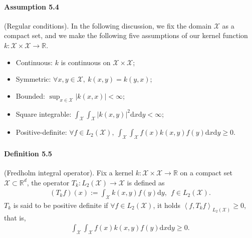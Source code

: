 \documentclass{article}
\begin{document}
\paragraph{Assumption 5.4} (Regular conditions). In the following discussion, we fix the domain $\mathcal{X}$ as a compact set, and we make the following five assumptions of our kernel function $k:\mathcal{X}\times\mathcal{X}\to\mathbb{R}$.
\begin{itemize}
	\item Continuous: $k$ is continuous on $\mathcal{X}\times\mathcal{X}$;
	\item Symmetric: $\forall x, y\in\mathcal{X},\ k(x,y) = k(y,x)$;
	\item Bounded: $\sup_{x\in\mathcal{X}}\left\vert k(x,x)\right\vert < \infty$;
	\item Square integrable: $\int_\mathcal{X}\int_\mathcal{X}\vert k(x,y)\vert^2\mathrm{d}x\mathrm{d}y < \infty$;
	\item Positive-definite:  $\forall f\in L_2(\mathcal{X}),\ \int_\mathcal{X}\int_\mathcal{X} f(x)k(x,y)f(y)\mathrm{d}x\mathrm{d}y \geq 0.$
\end{itemize}

\paragraph{Definition 5.5} (Fredholm integral operator). Fix a kernel $k:\mathcal{X}\times\mathcal{X}\to\mathbb{R}$ on a compact set $\mathcal{X}\subset\mathbb{R}^d$, the operator $T_k:L_2(\mathcal{X})\to\mathcal{X}$ is defined as
\begin{align}
	(T_kf)(x) := \int_\mathcal{X} k(x, y)f(y)\mathrm{d}y,\ \ f\in L_2(\mathcal{X}).\tag{5.12}
\end{align}
$T_k$ is said to be positive definite if $\forall f\in L_2(\mathcal{X})$, it holds $\left\langle f, T_kf\right\rangle_{L_2(\mathcal{X})} \geq 0$, that is,
\begin{align*}
	\int_\mathcal{X}\int_\mathcal{X} f(x)k(x,y)f(y)\mathrm{d}x\mathrm{d}y \geq 0.\tag{5.13}
\end{align*}
\end{document}
